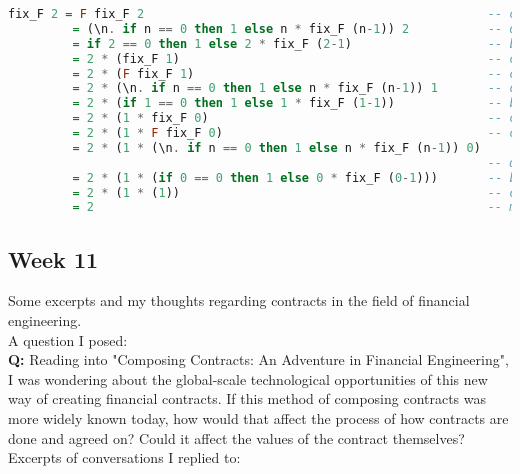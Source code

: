 \documentclass{article}
\theoremstyle{theorem}
\theoremstyle{definition}
\theoremstyle{remark}
\begin{document}
\begin{lstlisting}[language=Haskell]
fix_F 2 = F fix_F 2                                                -- computation rule of fix_F
         = (\n. if n == 0 then 1 else n * fix_F (n-1)) 2           -- definition of F and beta reduction
         = if 2 == 0 then 1 else 2 * fix_F (2-1)                   -- beta reduction of n
         = 2 * (fix_F 1)                                           -- computation rule of if/then/else
         = 2 * (F fix_F 1)                                         -- computation rule of fix_F
         = 2 * (\n. if n == 0 then 1 else n * fix_F (n-1)) 1       -- definition of F and beta reduction
         = 2 * (if 1 == 0 then 1 else 1 * fix_F (1-1))             -- beta reduction of n
         = 2 * (1 * fix_F 0)                                       -- computation rule of if/then/else
         = 2 * (1 * F fix_F 0)                                     -- computation rule of fix_F
         = 2 * (1 * (\n. if n == 0 then 1 else n * fix_F (n-1)) 0) 
                                                                   -- definition of F and beta reduction
         = 2 * (1 * (if 0 == 0 then 1 else 0 * fix_F (0-1)))       -- beta reduction of n
         = 2 * (1 * (1))                                           -- computation rule of if/then/else
         = 2                                                       -- multiplication
\end{lstlisting}
\newpage

\subsection{Week 11}
Some excerpts and my thoughts regarding contracts in the field of financial engineering.\\

\noindent A question I posed:\\

\textbf{Q:} Reading into "Composing Contracts: An Adventure in Financial Engineering", I was wondering about the global-scale technological opportunities of this new way of creating financial contracts. If this method of composing contracts was more widely known today, how would that affect the process of how contracts are done and agreed on? Could it affect the values of the contract themselves?\\

\noindent Excerpts of conversations I replied to:\\
\end{document}
